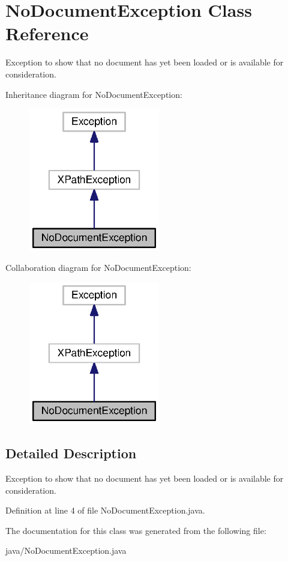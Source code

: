 \section{No\-Document\-Exception Class Reference}
\label{classorg_1_1smallfoot_1_1xpath_1_1NoDocumentException}


Exception to show that no document has yet been loaded or is available for consideration.  




Inheritance diagram for No\-Document\-Exception\-:\nopagebreak
\begin{figure}[H]
\begin{center}
\leavevmode
\includegraphics[width=162pt]{classorg_1_1smallfoot_1_1xpath_1_1NoDocumentException__inherit__graph}
\end{center}
\end{figure}


Collaboration diagram for No\-Document\-Exception\-:\nopagebreak
\begin{figure}[H]
\begin{center}
\leavevmode
\includegraphics[width=162pt]{classorg_1_1smallfoot_1_1xpath_1_1NoDocumentException__coll__graph}
\end{center}
\end{figure}


\subsection{Detailed Description}
Exception to show that no document has yet been loaded or is available for consideration. 

Definition at line 4 of file No\-Document\-Exception.\-java.



The documentation for this class was generated from the following file\-:\begin{DoxyCompactItemize}
\item 
java/No\-Document\-Exception.\-java\end{DoxyCompactItemize}

